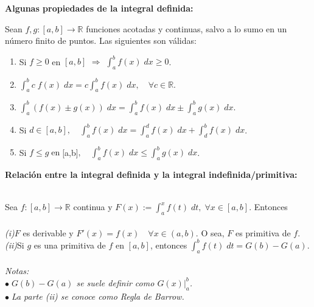 \documentclass{article}
\theoremstyle{definition}
\theoremstyle{definition}
\theoremstyle{remark}
\newcommand\R{\ensuremath{\mathbb{R}}}
\newcommand\bl{$\bullet\;$}
\begin{document}
\begin{center}
\textbf{Algunas propiedades de la integral definida:}
\end{center}
Sean $f,g : [a,b] \to \R $ funciones acotadas y continuas, salvo a lo sumo en un número finito de puntos. Las siguientes son válidas:
\begin{enumerate}
  \item Si $f \geq 0 $ en $[a,b]$ $\Rightarrow$ $\int_{a}^{b}f(x)\; dx \geq 0$.
  \item $\int_{a}^{b}c\;f(x)\;dx=c\int_{a}^{b}f(x)\;dx,\quad \forall c \in \R $.
  \item $\int_{a}^{b}{(f(x) \pm g(x))\;dx}=\int_{a}^{b}{f(x)} \; dx \pm \int_{a}^{b} {g(x)} \; dx$.
  \item Si $d \in [a,b],\quad  \int_{a}^{b}f(x)\;dx=\int_{a}^{d} f(x)\;dx+\int_{d}^{b} f(x)\;dx$.
  \item Si $f \leq g \; \text{en} \; $[a,b]$, \quad \int_{a}^{b}{f(x)\;dx}\leq\int_{a}^{b}{g(x)\;dx}$.
\end{enumerate}
\pagebreak
\begin{center}
\textbf{Relación entre la integral definida y la integral indefinida/primitiva:}
\end{center}
\begin{teo} \; \\
  Sea $f : [a,b] \to \R $ continua y $F(x):=\int_{a}^{x}f(t)\;dt,\;\forall x \in [a,b]$. Entonces\\\\
  \emph{\phantom{i}(i)}\quad$F$ es derivable y $F'(x)=f(x)\quad \forall x \in (a,b)$. O sea, $F$ es primitiva de $f$. \\
  \emph{(ii)}\quad  Si $g$ es una primitiva de $f$ en $[a,b]$, entonces $\int_{a}^{b}{f(t)\;dt}=G(b)-G(a)$. \\\\
  \emph{Notas: \\ \bl $G(b)-G(a)$ se suele definir como $G(x)|^b_a$. \\\bl La parte (ii) se conoce como \emph{Regla de Barrow}.}
\end{teo}
\end{document}
